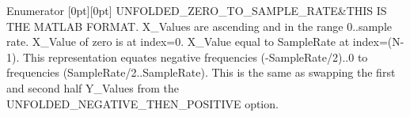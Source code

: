 \begin{DoxyEnumFields}{Enumerator}
[0pt][0pt]{}\mbox{\label{namespace_c_s_i_1_1_library_1_1_signal_processing_1_1_r_f_a6fb0758cf71ddc7c43ceacbe59de3411a0132c6c7881836b9b81de3c2c3d628d7}} 
U\+N\+F\+O\+L\+D\+E\+D\+\_\+\+Z\+E\+R\+O\+\_\+\+T\+O\+\_\+\+S\+A\+M\+P\+L\+E\+\_\+\+R\+A\+TE&T\+H\+IS IS T\+HE M\+A\+T\+L\+AB F\+O\+R\+M\+AT. X\+\_\+\+Values are ascending and in the range 0..sample rate. X\+\_\+\+Value of zero is at index=0. X\+\_\+\+Value equal to Sample\+Rate at index=(N-\/1). This representation equates negative frequencies (-\/Sample\+Rate/2)..0 to frequencies (Sample\+Rate/2..Sample\+Rate). This is the same as swapping the first and second half Y\+\_\+\+Values from the U\+N\+F\+O\+L\+D\+E\+D\+\_\+\+N\+E\+G\+A\+T\+I\+V\+E\+\_\+\+T\+H\+E\+N\+\_\+\+P\+O\+S\+I\+T\+I\+VE option. \\
\hline

\end{DoxyEnumFields}
